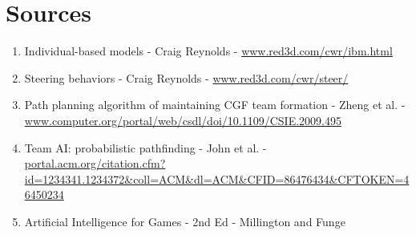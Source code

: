 \documentclass{article}
\begin{document}
\section {Sources}
\begin{enumerate}
\item Individual-based models - Craig Reynolds - \url{www.red3d.com/cwr/ibm.html}
\item Steering behaviors - Craig Reynolds - \url{www.red3d.com/cwr/steer/}
\item Path planning algorithm of maintaining CGF team formation - Zheng et al. - \url{www.computer.org/portal/web/csdl/doi/10.1109/CSIE.2009.495}
\item Team AI: probabilistic pathfinding - John et al. - \url{portal.acm.org/citation.cfm?id=1234341.1234372&coll=ACM&dl=ACM&CFID=86476434&CFTOKEN=46450234}
\item Artificial Intelligence for Games - 2nd Ed - Millington and Funge
\end{enumerate}
\end{document}
